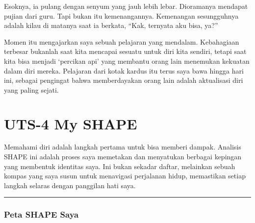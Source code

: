 \documentclass[
  letterpaper,
  DIV=11,
  numbers=noendperiod]{scrreprt}
\begin{document}
Esoknya, ia pulang dengan senyum yang jauh lebih lebar. Dioramanya
mendapat pujian dari guru. Tapi bukan itu kemenangannya. Kemenangan
sesungguhnya adalah kilau di matanya saat ia berkata, ``Kak, ternyata
aku bisa, ya?''

Momen itu mengajarkan saya sebuah pelajaran yang mendalam. Kebahagiaan
terbesar bukanlah saat kita mencapai sesuatu untuk diri kita sendiri,
tetapi saat kita bisa menjadi `percikan api' yang membantu orang lain
menemukan kekuatan dalam diri mereka. Pelajaran dari kotak kardus itu
terus saya bawa hingga hari ini, sebagai pengingat bahwa memberdayakan
orang lain adalah aktualisasi diri yang paling sejati.


\chapter{UTS-4 My SHAPE}\label{uts-4-my-shape}

Memahami diri adalah langkah pertama untuk bisa memberi dampak. Analisis
SHAPE ini adalah proses saya memetakan dan menyatukan berbagai kepingan
yang membentuk identitas saya. Ini bukan sekadar daftar, melainkan
sebuah kompas yang saya susun untuk menavigasi perjalanan hidup,
memastikan setiap langkah selaras dengan panggilan hati saya.

\begin{center}\rule{0.5\linewidth}{0.5pt}\end{center}

\subsection{Peta SHAPE Saya}\label{peta-shape-saya}
\end{document}
